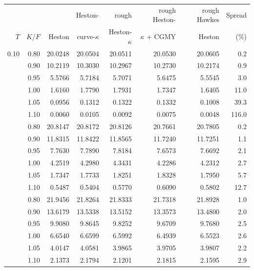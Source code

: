 \begin{tabular}{rrrrrrrr}
\toprule
 &  &  & Heston- & rough & rough Heston- & rough Hawkes & Spread\\
$T$ & $K/F$ & Heston & curve-$\kappa$ & Heston-$\kappa$ & $\kappa$ + CGMY & Heston & (\%)\\
\midrule
0.10 & 0.80 & 20.0248 & 20.0504 & 20.0511 & 20.0530 & 20.0605 & 0.2\\
 & 0.90 & 10.2119 & 10.3030 & 10.2967 & 10.2730 & 10.2174 & 0.9\\
 & 0.95 & 5.5766 & 5.7184 & 5.7071 & 5.6475 & 5.5545 & 3.0\\
 & 1.00 & 1.6160 & 1.7790 & 1.7931 & 1.7347 & 1.6405 & 11.0\\
 & 1.05 & 0.0956 & 0.1312 & 0.1322 & 0.1332 & 0.1008 & 39.3\\
 & 1.10 & 0.0060 & 0.0105 & 0.0092 & 0.0075 & 0.0048 & 116.0\\
\addlinespace
0.50 & 0.80 & 20.8147 & 20.8172 & 20.8126 & 20.7661 & 20.7805 & 0.2\\
 & 0.90 & 11.8315 & 11.8422 & 11.8565 & 11.7240 & 11.7251 & 1.1\\
 & 0.95 & 7.7630 & 7.7890 & 7.8184 & 7.6573 & 7.6692 & 2.1\\
 & 1.00 & 4.2519 & 4.2980 & 4.3431 & 4.2286 & 4.2312 & 2.7\\
 & 1.05 & 1.7347 & 1.7733 & 1.8251 & 1.8328 & 1.7950 & 5.7\\
 & 1.10 & 0.5487 & 0.5404 & 0.5770 & 0.6090 & 0.5802 & 12.7\\
\addlinespace
1.00 & 0.80 & 21.9456 & 21.8264 & 21.8333 & 21.7318 & 21.8928 & 1.0\\
 & 0.90 & 13.6179 & 13.5338 & 13.5152 & 13.3573 & 13.4800 & 2.0\\
 & 0.95 & 9.9080 & 9.8645 & 9.8252 & 9.6709 & 9.7680 & 2.5\\
 & 1.00 & 6.6540 & 6.6599 & 6.5992 & 6.4939 & 6.5523 & 2.6\\
 & 1.05 & 4.0147 & 4.0581 & 3.9865 & 3.9705 & 3.9807 & 2.2\\
 & 1.10 & 2.1373 & 2.1794 & 2.1201 & 2.1815 & 2.1595 & 2.9\\
\bottomrule
\end{tabular}
